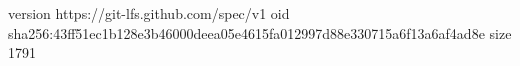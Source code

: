 version https://git-lfs.github.com/spec/v1
oid sha256:43ff51ec1b128e3b46000deea05e4615fa012997d88e330715a6f13a6af4ad8e
size 1791
